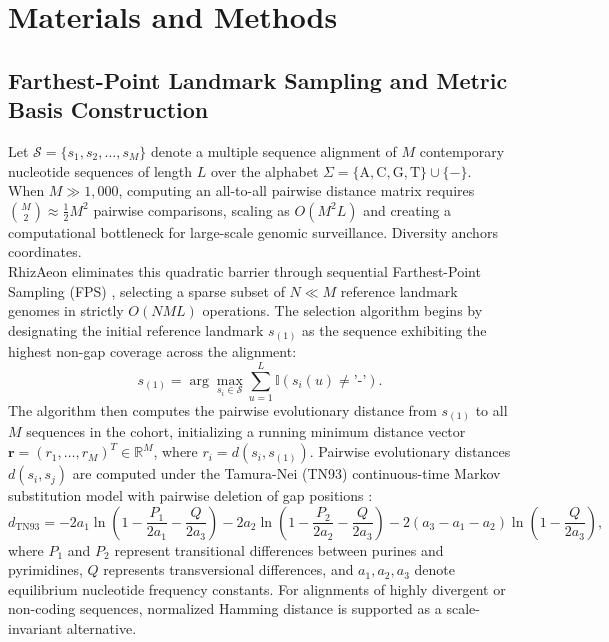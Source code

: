 \section{Materials and Methods}
\label{sec:methods}

\subsection{Farthest-Point Landmark Sampling and Metric Basis Construction}
\label{subsec:methods_landmark_sampling}

Let $\mathcal{S} = \{s_1, s_2, \dots, s_M\}$ denote a multiple sequence alignment of $M$ contemporary nucleotide sequences of length $L$ over the alphabet $\Sigma = \{\text{A}, \text{C}, \text{G}, \text{T}\} \cup \{-\}$.
When $M \gg 1,000$, computing an all-to-all pairwise distance matrix requires $\binom{M}{2} \approx \frac{1}{2} M^2$ pairwise comparisons, scaling as $O(M^2 L)$ and creating a computational bottleneck for large-scale genomic surveillance.
Diversity anchors coordinates.
\\RhizAeon eliminates this quadratic barrier through sequential Farthest-Point Sampling (FPS) \citep{gonzalez1985clustering}, selecting a sparse subset of $N \ll M$ reference landmark genomes in strictly $O(N M L)$ operations.
The selection algorithm begins by designating the initial reference landmark $s_{(1)}$ as the sequence exhibiting the highest non-gap coverage across the alignment:
\begin{equation}
s_{(1)} = \arg\max_{s_i \in \mathcal{S}} \sum_{u=1}^L \mathbb{I}(s_i(u) \neq \text{'-'}).
\label{eq:methods_fps_seed}
\end{equation}
The algorithm then computes the pairwise evolutionary distance from $s_{(1)}$ to all $M$ sequences in the cohort, initializing a running minimum distance vector $\mathbf{r} = (r_1, \dots, r_M)^T \in \mathbb{R}^M$, where $r_i = d(s_i, s_{(1)})$.
Pairwise evolutionary distances $d(s_i, s_j)$ are computed under the Tamura-Nei (TN93) continuous-time Markov substitution model with pairwise deletion of gap positions \citep{tamura1993estimation}:
\begin{equation}
d_{\text{TN93}} = -2 a_1 \ln\left(1 - \frac{P_1}{2 a_1} - \frac{Q}{2 a_3}\right) - 2 a_2 \ln\left(1 - \frac{P_2}{2 a_2} - \frac{Q}{2 a_3}\right) - 2 (a_3 - a_1 - a_2) \ln\left(1 - \frac{Q}{2 a_3}\right),
\label{eq:methods_tn93}
\end{equation}
where $P_1$ and $P_2$ represent transitional differences between purines and pyrimidines, $Q$ represents transversional differences, and $a_1, a_2, a_3$ denote equilibrium nucleotide frequency constants.
For alignments of highly divergent or non-coding sequences, normalized Hamming distance is supported as a scale-invariant alternative.

